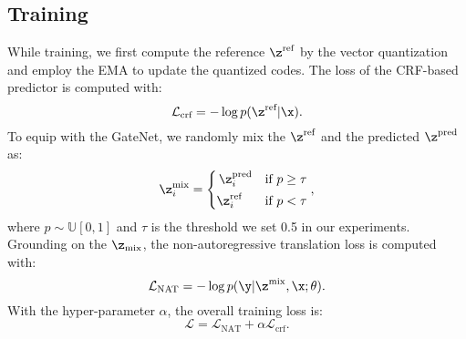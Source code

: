 \subsection{Training}
While training, we first compute the reference $\z^\text{ref}$ by the vector quantization and employ the EMA to update the quantized codes.
The loss of the CRF-based predictor is computed with:
\begin{equation}
    \mathcal{L}_\text{crf} = -\operatorname{log} p(\z^\text{ref}|\x).
\end{equation}
To equip with the GateNet, we randomly mix the $\z^\text{ref}$ and the predicted $\z^\text{pred}$ as:
\begin{equation}
    \z_i^\text{mix}=\left\{
\begin{aligned}
\z_i^\text{pred} &\quad \text{if}\ p \geq \tau \\
\z_i^\text{ref\ \ \ } &\quad \text{if}\ p < \tau 
\end{aligned}
\right.,
\label{eqn:mix}
\end{equation}
where $p\sim \mathbb{U}[0,1]$ and $\tau$ is the threshold we set 0.5 in our experiments. 
Grounding on the $\z_\text{mix}$, the non-autoregressive translation loss is computed with: %
\begin{equation}
    \mathcal{L}_\text{NAT} =  -\operatorname{log} p(\y|\z^\text{mix},\x;\theta).
\end{equation}
With the hyper-parameter $\alpha$, the overall training loss is:
\begin{equation}
    \mathcal{L} = \mathcal{L}_\text{NAT} + \alpha\mathcal{L}_\text{crf}.
    \label{eqn:loss}
\end{equation}




